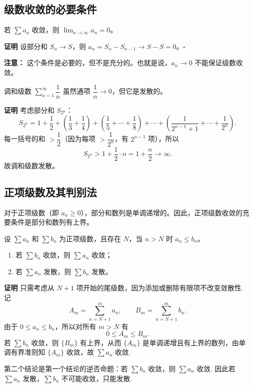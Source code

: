 \documentclass[fontset=fandol]{ctexart}
\newenvironment{custom}[1]{\par\noindent\textbf{#1}\quad}{\par\vspace{0.8em}}
\begin{document}
\subsection{级数收敛的必要条件}

\begin{theorem}[级数收敛的必要条件]
若 \(\sum a_n\) 收敛，则 \(\lim_{n\to\infty} a_n = 0\)。
\end{theorem}

\begin{custom}{证明}
设部分和 \(S_n \to S\)，则 \(a_n = S_n - S_{n-1} \to S - S = 0\)。\(\square\)
\end{custom}

\textbf{注意：} 这个条件是必要的，但不是充分的。也就是说，\(a_n \to 0\) 不能保证级数收敛。

\begin{example}[调和级数]
调和级数 \(\sum_{n=1}^{\infty} \dfrac{1}{n}\) 虽然通项 \(\dfrac{1}{n} \to 0\)，但它是发散的。
\end{example}
\begin{custom}{证明}
考虑部分和 \(S_{2^n}\)：
\[
S_{2^n} = 1 + \dfrac12 + \left(\dfrac13+\dfrac14\right) + \left(\dfrac15+\cdots+\dfrac18\right) + \cdots + \left(\dfrac{1}{2^{n-1}+1} + \cdots + \dfrac{1}{2^n}\right).
\]
每一括号的和 \(> \dfrac12\)（因为每项 \(> \dfrac{1}{2^n}\)，有 \(2^{n-1}\) 项），所以
\[
S_{2^n} > 1 + \dfrac12 \cdot n = 1 + \dfrac{n}{2} \to \infty.
\]
故调和级数发散。
\end{custom}

\subsection{正项级数及其判别法}

对于正项级数（即 \(a_n \geq 0\)），部分和数列是单调递增的。因此，正项级数收敛的充要条件是部分和数列有上界。

\begin{theorem}[比较判别法]
设 \(\sum a_n\) 和 \(\sum b_n\) 为正项级数，且存在 \(N\)，当 \(n > N\) 时 \(a_n \leq b_n\)。
\begin{enumerate}
\item 若 \(\sum b_n\) 收敛，则 \(\sum a_n\) 收敛；
\item 若 \(\sum a_n\) 发散，则 \(\sum b_n\) 发散。
\end{enumerate}
\end{theorem}

\begin{custom}{证明}
只需考虑从 $N+1$ 项开始的尾级数，因为添加或删除有限项不改变敛散性. 记
\[
A_m=\sum_{n=N+1}^{m}a_n,\qquad B_m=\sum_{n=N+1}^{m}b_n.
\]
由于 $0\le a_n\le b_n$，所以对所有 $m>N$ 有
\[
0\le A_m\le B_m.
\]
若 $\sum b_n$ 收敛，则 $\{B_m\}$ 有上界，从而 $\{A_m\}$ 是单调递增且有上界的数列，由单调有界准则知 $\{A_m\}$ 收敛，故 $\sum a_n$ 收敛.

第二个结论是第一个结论的逆否命题：若 $\sum b_n$ 收敛，则 $\sum a_n$ 收敛. 因此若 $\sum a_n$ 发散，$\sum b_n$ 不可能收敛，只能发散.
\end{custom}
\end{document}
